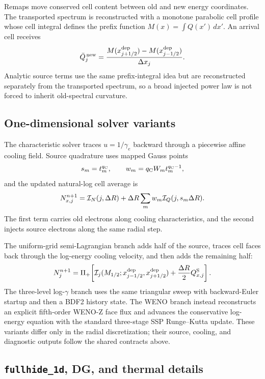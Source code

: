 \documentclass[twocolumn]{aastex702}
\begin{document}
Remaps move conserved cell content between old and new energy coordinates.  The
transported spectrum is reconstructed with a monotone parabolic cell profile
whose cell integral defines the prefix function \(M(x)=\int Q(x')\,dx'\).  An
arrival cell receives
\begin{equation}
\bar Q_j^{\,{\rm new}}=
\frac{M(x_{j+1/2}^{\rm dep})-M(x_{j-1/2}^{\rm dep})}{\Delta x_j}.
\end{equation}
Analytic source terms use the same prefix-integral idea but are reconstructed
separately from the transported spectrum, so a broad injected power law is not
forced to inherit old-spectral curvature.

\subsection{One-dimensional solver variants}

The characteristic solver traces \(u=1/\gamma_e\) backward through a piecewise
affine cooling field.  Source quadrature uses mapped Gauss points
\begin{equation}
s_m=t_m^{q_{\rm C}},\qquad
w_m=q_{\rm C}W_mt_m^{q_{\rm C}-1},
\end{equation}
and the updated natural-log cell average is
\begin{equation}
N_{x,j}^{n+1}={\cal I}_N(j,\Delta R)
+\Delta R\sum_mw_m{\cal I}_Q(j,s_m\Delta R).
\end{equation}
The first term carries old electrons along cooling characteristics, and the
second injects source electrons along the same radial step.

The uniform-grid semi-Lagrangian branch adds half of the source, traces cell faces
back through the log-energy cooling velocity, and then adds the remaining half:
\begin{equation}
N_j^{n+1}=\Pi_+\!\left[
\mathcal I_j(M_{1/2};x_{j-1/2}^{\rm dep},x_{j+1/2}^{\rm dep})
+\frac{\Delta R}{2}Q_{x,j}^{\rm S}\right].
\end{equation}
The three-level log-\(\gamma\) branch uses the same triangular sweep with
backward-Euler startup and then a BDF2 history state.  The WENO branch instead
reconstructs an explicit fifth-order WENO-Z face flux and advances the
conservative log-energy equation with the standard three-stage SSP Runge--Kutta
update.  These variants differ only in the radial discretization; their source,
cooling, and diagnostic outputs follow the shared contracts above.

\subsection{\texttt{fullhide\_1d}, DG, and thermal details}
\end{document}
